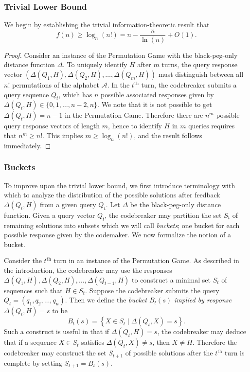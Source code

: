 \documentclass[12pt, a4paper]{article}
\newcommand{\nth}{^{\text{th}}}       %
\begin{document}
	\subsubsection{Trivial Lower Bound}
	We begin by establishing the trivial information-theoretic result that
	\begin{equation*}
		f(n)\ge \log_{n}(n!) = n-\frac{n}{\ln(n)}+O(1).
	\end{equation*}
	\begin{proof}
		Consider an instance of the Permutation Game with the black-peg-only distance function $\Delta$. To uniquely identify $H$ after $m$ turns, the query response vector $(\Delta(Q_1, H), \Delta(Q_2, H), \ldots, \Delta(Q_m, H))$ must distinguish between all $n!$ permutations of the alphabet $\mathcal{A}$. In the $t\nth$ turn, the codebreaker submits a query sequence $Q_t$, which has $n$ possible associated responses given by $\Delta(Q_t, H)\in\{0, 1, \ldots, n-2, n\}$. We note that it is not possible to get $\Delta(Q_t, H)=n-1$ in the Permutation Game. Therefore there are $n^m$ possible query response vectors of length $m$, hence to identify $H$ in $m$ queries requires that $n^m\ge n!$. This implies $m\ge\log_n(n!)$, and the result follows immediately.
	\end{proof}

	\subsubsection{Buckets}
	To improve upon the trivial lower bound, we first introduce terminology with which to analyze the distribution of the possible solutions after feedback $\Delta(Q_t, H)$ from a given query $Q_t$. Let $\Delta$ be the black-peg-only distance function. Given a query vector $Q_t$, the codebreaker may partition the set $S_t$ of remaining solutions into subsets which we will call \textit{buckets}; one bucket for each possible response given by the codemaker. We now formalize the notion of a bucket.
	
	Consider the $t\nth$ turn in an instance of the Permutation Game. As described in the introduction, the codebreaker may use the responses $\Delta(Q_1, H), \Delta(Q_2, H), \ldots, \Delta(Q_{t-1}, H)$ to construct a minimal set $S_t$ of sequences such that $H\in S_t$. Suppose the codebreaker submits the query $Q_t = (q_1, q_2, \ldots, q_n)$. Then we define the \textit{bucket $B_t(s)$ implied by response $\Delta(Q_t, H)=s$} to be
	\begin{equation*}
		B_t(s) = \left\{X\in S_t\mid \Delta(Q_t, X) = s\right\}.
	\end{equation*}
	Such a construct is useful in that if $\Delta(Q_t, H) = s$, the codebreaker may deduce that if a sequence $X\in S_t$ satisfies $\Delta(Q_t, X)\neq s$, then $X\neq H$. Therefore the codebreaker may construct the set $S_{t+1}$ of possible solutions after the $t\nth$ turn is complete by setting $S_{t+1} = B_t(s)$.
	
\end{document}
